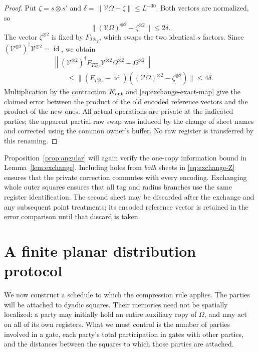 \documentclass[11pt]{article}
\numberwithin{equation}{section}
\theoremstyle{definition}
\theoremstyle{remark}
\DeclareMathOperator{\id}{id}
\newcommand{\norm}[1]{\lVert #1\rVert}
\begin{document}
\begin{proof}
Put $\zeta=s\otimes s'$ and
$\delta=\norm{\mathcal V\Omega-\zeta}\le L^{-30}$.  Both vectors are
normalized, so
\[
 \norm{(\mathcal V\Omega)^{\otimes2}-\zeta^{\otimes2}}
      \le2\delta.
\]
The vector $\zeta^{\otimes2}$ is fixed by $F_{T\mathcal B_T}$, which swaps
the two identical $s$ factors.  Since
$(\mathcal V^{\otimes2})^{\dagger}\mathcal V^{\otimes2}=\id$, we obtain
\begin{align*}
 &\left\|
   (\mathcal V^{\otimes2})^{\dagger}F_{T\mathcal B_T}
        \mathcal V^{\otimes2}\Omega^{\otimes2}-\Omega^{\otimes2}
   \right\|\\
 &\hspace{2em}\le
   \norm{(F_{T\mathcal B_T}-\id)
                    ((\mathcal V\Omega)^{\otimes2}-\zeta^{\otimes2})}
       \le4\delta.
\end{align*}
Multiplication by the contraction $K_{\rm out}$ and
\eqref{eq:exchange-exact-map} give the claimed error between the product
of the old encoded reference vectors and the product of the new ones.
All actual operations are private at the indicated parties; the apparent
partial raw swap was induced by the change of sheet names and corrected
using the common owner's buffer.  No raw register is transferred by this
renaming.
\end{proof}

Proposition~\ref{prop:angular} will again verify the one-copy information
bound in Lemma~\ref{lem:exchange}.  Including holes from \emph{both} sheets
in \eqref{eq:exchange-Z} ensures that the private correction commutes with
every encoding.  Exchanging whole outer squares ensures that all tag and
radius branches use the same register identification.  The second sheet
may be discarded after the exchange and any subsequent point treatments;
its encoded reference vector is retained in the error comparison until
that discard is taken.

\section{A finite planar distribution protocol}
\label{sec:geometry}

We now construct a schedule to which the compression rule applies.
The parties will be attached to dyadic squares.  Their memories need not
be spatially localized: a party may initially hold an entire auxiliary
copy of $\Omega$, and may act on all of its own registers.  What we must
control is the number of parties involved in a gate, each party's total
participation in gates with other parties, and the distances between the
squares to which those parties are attached.
\end{document}
